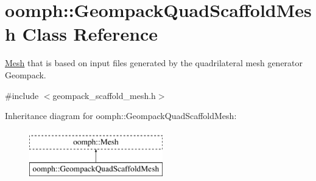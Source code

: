 \hypertarget{classoomph_1_1GeompackQuadScaffoldMesh}{}\section{oomph\+:\+:Geompack\+Quad\+Scaffold\+Mesh Class Reference}
\label{classoomph_1_1GeompackQuadScaffoldMesh}


\hyperlink{classoomph_1_1Mesh}{Mesh} that is based on input files generated by the quadrilateral mesh generator Geompack.  




{\ttfamily \#include $<$geompack\+\_\+scaffold\+\_\+mesh.\+h$>$}

Inheritance diagram for oomph\+:\+:Geompack\+Quad\+Scaffold\+Mesh\+:\begin{figure}[H]
\begin{center}
\leavevmode
\includegraphics[height=2.000000cm]{classoomph_1_1GeompackQuadScaffoldMesh}
\end{center}
\end{figure}
